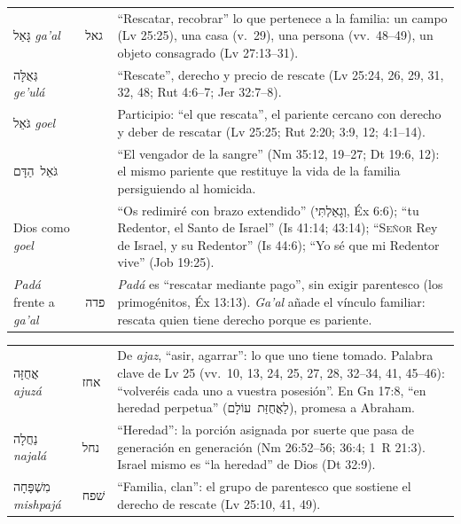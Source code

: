 \documentclass[11pt,letterpaper]{article}
\newcommand{\heb}[1]{\mbox{\foreignlanguage{hebrew}{#1}}}
\newcommand{\SENOR}{\textsc{Señor}}
\begin{document}
\begin{filologia}
\begin{tabular}{@{}L{3.3cm}L{1.4cm}L{9.85cm}@{}}
\heb{גָּאַל} \emph{ga'al} & \heb{גאל} & ``Rescatar, recobrar'' lo que pertenece a la familia: un campo (Lv 25:25), una casa (v.~29), una persona (vv.~48--49), un objeto consagrado (Lv 27:13--31). \\[2pt]
\heb{גְּאֻלָּה} \emph{ge'ulá} & & ``Rescate'', derecho y precio de rescate (Lv 25:24, 26, 29, 31, 32, 48; Rut 4:6--7; Jer 32:7--8). \\[2pt]
\heb{גֹּאֵל} \emph{goel} & & Participio: ``el que rescata'', el pariente cercano con derecho y deber de rescatar (Lv 25:25; Rut 2:20; 3:9, 12; 4:1--14). \\[2pt]
\heb{גֹּאֵל הַדָּם} & & ``El vengador de la sangre'' (Nm 35:12, 19--27; Dt 19:6, 12): el mismo pariente que restituye la vida de la familia persiguiendo al homicida. \\[2pt]
Dios como \emph{goel} & & ``Os redimiré con brazo extendido'' (\heb{וְגָאַלְתִּי}, Éx 6:6); ``tu Redentor, el Santo de Israel'' (Is 41:14; 43:14); ``\SENOR{} Rey de Israel, y su Redentor'' (Is 44:6); ``Yo sé que mi Redentor vive'' (Job 19:25). \\[2pt]
\emph{Padá} frente a \emph{ga'al} & \heb{פדה} & \emph{Padá} es ``rescatar mediante pago'', sin exigir parentesco (los primogénitos, Éx 13:13). \emph{Ga'al} añade el vínculo familiar: rescata quien tiene derecho porque es pariente. \\
\end{tabular}
\end{filologia}

\begin{filologia}
\begin{tabular}{@{}L{3.3cm}L{1.4cm}L{9.85cm}@{}}
\heb{אֲחֻזָּה} \emph{ajuzá} & \heb{אחז} & De \emph{ajaz}, ``asir, agarrar'': lo que uno tiene tomado. Palabra clave de Lv 25 (vv.~10, 13, 24, 25, 27, 28, 32--34, 41, 45--46): ``volveréis cada uno a vuestra posesión''. En Gn 17:8, ``en heredad perpetua'' (\heb{לַאֲחֻזַּת עוֹלָם}), promesa a Abraham. \\[2pt]
\heb{נַחֲלָה} \emph{najalá} & \heb{נחל} & ``Heredad'': la porción asignada por suerte que pasa de generación en generación (Nm 26:52--56; 36:4; 1~R 21:3). Israel mismo es ``la heredad'' de Dios (Dt 32:9). \\[2pt]
\heb{מִשְׁפָּחָה} \emph{mishpajá} & \heb{שׁפח} & ``Familia, clan'': el grupo de parentesco que sostiene el derecho de rescate (Lv 25:10, 41, 49). \\
\end{tabular}
\end{filologia}
\end{document}
